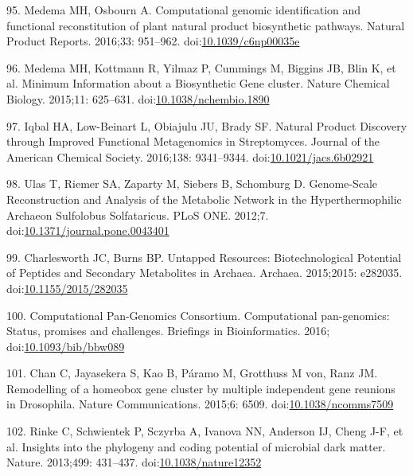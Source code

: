 \documentclass[12pt,twoside]{reedthesis}
\begin{document}
  \hypertarget{ref-medemaux5fcomputationalux5f2016}{}
  95. Medema MH, Osbourn A. Computational genomic identification and
  functional reconstitution of plant natural product biosynthetic
  pathways. Natural Product Reports. 2016;33: 951--962.
  doi:\href{https://doi.org/10.1039/c6np00035e}{10.1039/c6np00035e}
  
  \hypertarget{ref-medemaux5fminimumux5f2015}{}
  96. Medema MH, Kottmann R, Yilmaz P, Cummings M, Biggins JB, Blin K, et
  al. Minimum Information about a Biosynthetic Gene cluster. Nature
  Chemical Biology. 2015;11: 625--631.
  doi:\href{https://doi.org/10.1038/nchembio.1890}{10.1038/nchembio.1890}
  
  \hypertarget{ref-iqbalux5fnaturalux5f2016}{}
  97. Iqbal HA, Low-Beinart L, Obiajulu JU, Brady SF. Natural Product
  Discovery through Improved Functional Metagenomics in Streptomyces.
  Journal of the American Chemical Society. 2016;138: 9341--9344.
  doi:\href{https://doi.org/10.1021/jacs.6b02921}{10.1021/jacs.6b02921}
  
  \hypertarget{ref-ulasux5fgenome-scaleux5f2012}{}
  98. Ulas T, Riemer SA, Zaparty M, Siebers B, Schomburg D. Genome-Scale
  Reconstruction and Analysis of the Metabolic Network in the
  Hyperthermophilic Archaeon Sulfolobus Solfataricus. PLoS ONE. 2012;7.
  doi:\href{https://doi.org/10.1371/journal.pone.0043401}{10.1371/journal.pone.0043401}
  
  \hypertarget{ref-charlesworthux5funtappedux5f2015}{}
  99. Charlesworth JC, Burns BP. Untapped Resources: Biotechnological
  Potential of Peptides and Secondary Metabolites in Archaea. Archaea.
  2015;2015: e282035.
  doi:\href{https://doi.org/10.1155/2015/282035}{10.1155/2015/282035}
  
  \hypertarget{ref-computationalux5fpan-genomicsux5fconsortiumux5fcomputationalux5f2016}{}
  100. Computational Pan-Genomics Consortium. Computational pan-genomics:
  Status, promises and challenges. Briefings in Bioinformatics. 2016;
  doi:\href{https://doi.org/10.1093/bib/bbw089}{10.1093/bib/bbw089}
  
  \hypertarget{ref-chanux5fremodellingux5f2015}{}
  101. Chan C, Jayasekera S, Kao B, Páramo M, Grotthuss M von, Ranz JM.
  Remodelling of a homeobox gene cluster by multiple independent gene
  reunions in Drosophila. Nature Communications. 2015;6: 6509.
  doi:\href{https://doi.org/10.1038/ncomms7509}{10.1038/ncomms7509}
  
  \hypertarget{ref-rinkeux5finsightsux5f2013}{}
  102. Rinke C, Schwientek P, Sczyrba A, Ivanova NN, Anderson IJ, Cheng
  J-F, et al. Insights into the phylogeny and coding potential of
  microbial dark matter. Nature. 2013;499: 431--437.
  doi:\href{https://doi.org/10.1038/nature12352}{10.1038/nature12352}
  
\end{document}

